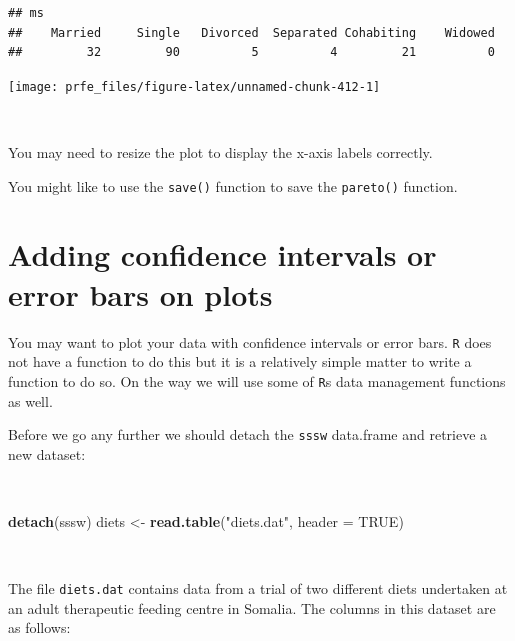 \documentclass[12pt,a4paper]{book}
\newenvironment{Shaded}{\begin{snugshade}}{\end{snugshade}}
\newcommand{\DataTypeTok}[1]{\textcolor[rgb]{0.13,0.29,0.53}{#1}}
\newcommand{\KeywordTok}[1]{\textcolor[rgb]{0.13,0.29,0.53}{\textbf{#1}}}
\newcommand{\NormalTok}[1]{#1}
\newcommand{\OtherTok}[1]{\textcolor[rgb]{0.56,0.35,0.01}{#1}}
\newcommand{\StringTok}[1]{\textcolor[rgb]{0.31,0.60,0.02}{#1}}
\theoremstyle{definition}
\theoremstyle{definition}
\theoremstyle{definition}
\theoremstyle{remark}
\begin{document}
\begin{verbatim}
## ms
##    Married     Single   Divorced  Separated Cohabiting    Widowed 
##         32         90          5          4         21          0
\end{verbatim}

\begin{center}\texttt{[image: prfe\_files/figure-latex/unnamed-chunk-412-1]} \end{center}

~

You may need to resize the plot to display the x-axis labels correctly.

You might like to use the \texttt{save()} function to save the
\texttt{pareto()} function.

\newpage

\hypertarget{adding-confidence-intervals-or-error-bars-on-plots}{%
\section{Adding confidence intervals or error bars on
plots}\label{adding-confidence-intervals-or-error-bars-on-plots}}

You may want to plot your data with confidence intervals or error bars.
\texttt{R} does not have a function to do this but it is a relatively
simple matter to write a function to do so. On the way we will use some
of \texttt{R}s data management functions as well.

Before we go any further we should detach the \texttt{sssw} data.frame
and retrieve a new dataset:

~

\begin{Shaded}
\begin{Highlighting}[]
\KeywordTok{detach}\NormalTok{(sssw)}
\NormalTok{diets <-}\StringTok{ }\KeywordTok{read.table}\NormalTok{(}\StringTok{"diets.dat"}\NormalTok{, }\DataTypeTok{header =} \OtherTok{TRUE}\NormalTok{)}
\end{Highlighting}
\end{Shaded}

~

The file \texttt{diets.dat} contains data from a trial of two different
diets undertaken at an adult therapeutic feeding centre in Somalia. The
columns in this dataset are as follows:

~
\end{document}
